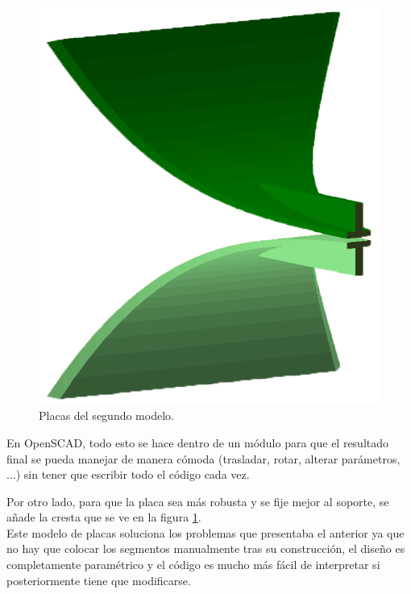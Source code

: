 \documentclass[11pt,a4paper,twoside,pdf]{article}
\numberwithin{equation}{section}
\begin{document}
\begin{figure}
    \vspace{-0.9cm}
    \includegraphics[width=\linewidth]{img/modelos/2025_02_21-ExtrudeFunctYSuavizado/cresta.png}
    \caption{Placas del segundo modelo.}\label{fig:cresta}
\end{figure}
En OpenSCAD, todo esto se hace dentro de un módulo para que el resultado final se pueda manejar de manera cómoda (trasladar, rotar, alterar parámetros, ...) sin tener que escribir todo el código cada vez.

Por otro lado, para que la placa sea más robusta y se fije mejor al soporte, se añade la cresta que se ve en la figura \ref{fig:cresta}.\\

Este modelo de placas soluciona los problemas que presentaba el anterior ya que no hay que colocar los segmentos manualmente tras su construcción, el diseño es completamente paramétrico y el código es mucho más fácil de interpretar si posteriormente tiene que modificarse.


\end{document}
